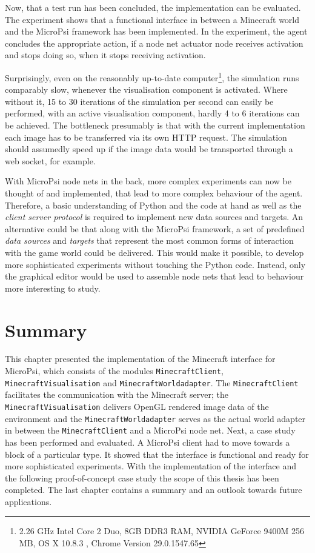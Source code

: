 Now, that a test run has been concluded, the implementation can be evaluated.
The experiment shows that a functional interface in between a Minecraft world and the MicroPsi framework has been implemented. In the experiment, the agent concludes the appropriate action, if a node net actuator node receives activation and stops doing so, when it stops receiving activation.

Surprisingly, even on the reasonably up-to-date computer\footnote{2.26 GHz Intel Core 2 Duo, 8GB DDR3 RAM, NVIDIA GeForce 9400M 256 MB, OS X 10.8.3 , Chrome Version 29.0.1547.65}, the simulation runs comparably slow, whenever the visualisation component is activated. Where without it, 15 to 30 iterations of the simulation per second can easily be performed, with an active visualisation component, hardly 4 to 6 iterations can be achieved. The bottleneck presumably is that with the current implementation each image has to be transferred via its own HTTP request. The simulation should assumedly speed up if the image data would be transported through a web socket, for example.

With MicroPsi node nets in the back, more complex experiments can now be thought of and implemented, that lead to more complex behaviour of the agent. Therefore, a basic understanding of Python and the code at hand as well as the \emph{client server protocol} is required to implement new data sources and targets. An alternative could be that along with the MicroPsi framework, a set of predefined \emph{data sources} and \emph{targets} that represent the most common forms of interaction with the game world could be delivered. This would make it possible, to develop more sophisticated experiments without touching the Python code. Instead, only the graphical editor would be used to assemble node nets that lead to behaviour more interesting to study.

    \section{Summary}
This chapter presented the implementation of the Minecraft interface for MicroPsi, which consists of the modules \texttt{MinecraftClient}, \texttt{MinecraftVisualisation} and \texttt{MinecraftWorldadapter}. The \texttt{MinecraftClient} facilitates the communication with the Minecraft server; the \texttt{MinecraftVisualisation} delivers OpenGL rendered image data of the environment and the \texttt{MinecraftWorldadapter} serves as the actual world adapter in between the \texttt{MinecraftClient} and a MicroPsi node net.
Next, a case study has been performed and evaluated. A MicroPsi client had to move towards a block of a particular type. It showed that the interface is functional and ready for more sophisticated experiments.
With the implementation of the interface and the following proof-of-concept case study the scope of this thesis has been completed. The last chapter contains a summary and an outlook towards future applications.